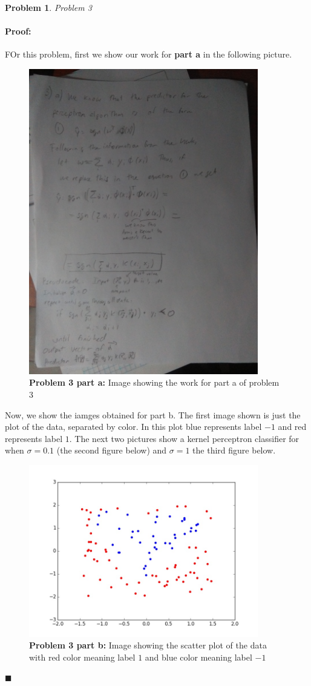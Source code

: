 \documentclass[12pt]{article}
\newenvironment{proof}{\paragraph{Proof: }}{\hfill$\blacksquare$}
\newtheorem{problem}{Problem}%
\begin{document}
\begin{problem}
\normalfont
Problem 3
\end{problem}

\begin{proof}

FOr this problem, first we show our work for \textbf{part a} in the following picture.

\begin{figure}[!htbp]
\centering
\includegraphics[width=10cm]{hw3_prob3b.jpg}
\caption{\textbf{Problem 3 part a:} Image showing the work for part a of problem 3}
\end{figure}

Now, we show the iamges obtained for part b. The first image shown is just the plot of the data, separated by color. In this plot
blue represents label $-1$ and red represents  label $1$. The next two pictures show a kernel perceptron classifier for when $\sigma = 0.1$ (the second figure below) and $\sigma = 1$ the third figure below. 

\begin{figure}[!htbp]
\centering
\includegraphics[width=10cm]{hw3_prob3a.jpg}
\caption{\textbf{Problem 3 part b:} Image showing the scatter plot of the data with red color meaning label $1$ and blue color meaning label $-1$}
\end{figure}


\end{proof}
\end{document}
